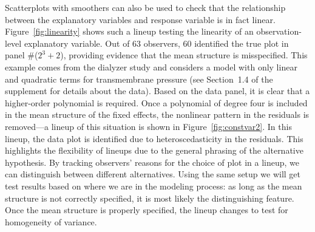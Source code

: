 \documentclass[12pt]{article}
\newcommand{\alnote}[1]{\todo[inline,color=green!40]{#1}} %
\newcommand{\hhnote}[1]{\todo[inline,color=orange!40]{#1}}
\begin{document}
Scatterplots with smoothers can also be used to check that the relationship between the explanatory variables and response variable is in fact linear. Figure~\ref{fig:linearity} shows such a lineup testing the linearity of an observation-level explanatory variable. Out of 63 observers, 60 identified the true plot in panel \#($2^3 + 2$), providing evidence that the mean structure is misspecified. This example comes from the dialyzer study and considers a model with only linear and quadratic terms for transmembrane pressure (see Section~1.4 of the supplement for details about the data). Based on the data panel, it is clear that a higher-order polynomial is required. 
Once a polynomial of degree four is included in the mean structure of the fixed effects, the nonlinear pattern in the residuals is removed---a lineup of this situation is shown in Figure~\ref{fig:constvar2}. In this lineup, the data plot is identified due to heteroscedasticity in the residuals.  This highlights the flexibility of lineups due to the general phrasing of the alternative hypothesis. By tracking observers' reasons for the choice of plot in a lineup, we can distinguish between different alternatives. 
Using the same setup we will get test results based on where we are in the modeling process: as long as the mean structure is not correctly specified, it is most likely the distinguishing feature. Once the mean structure is properly specified, the lineup changes to test for homogeneity of variance. 
\end{document}
